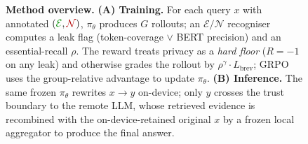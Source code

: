 \begin{figure}[t]
\begin{tikzpicture}
\end{tikzpicture}

\caption{\textbf{Method overview.}
\textbf{(A) Training.} For each query $x$ with annotated
$(\textcolor{\colE}{\mathcal{E}},\textcolor{\colN}{\mathcal{N}})$,
$\pi_\theta$ produces $G$ rollouts; an $\mathcal{E}/\mathcal{N}$
recogniser computes a leak flag (token-coverage $\lor$ BERT precision)
and an essential-recall $\rho$. The reward treats privacy as a
\emph{hard floor} ($R{=}{-1}$ on any leak) and otherwise grades the
rollout by $\rho^{\gamma}\!\cdot\!L_{\text{brev}}$; GRPO uses the
group-relative advantage to update $\pi_\theta$.
\textbf{(B) Inference.} The same frozen $\pi_\theta$ rewrites
$x\!\to\!y$ on-device; only $y$ crosses the trust boundary to the
remote LLM, whose retrieved evidence is recombined with the
on-device-retained original $x$ by a frozen local aggregator to
produce the final answer.}
\label{fig:method}
\end{figure}
